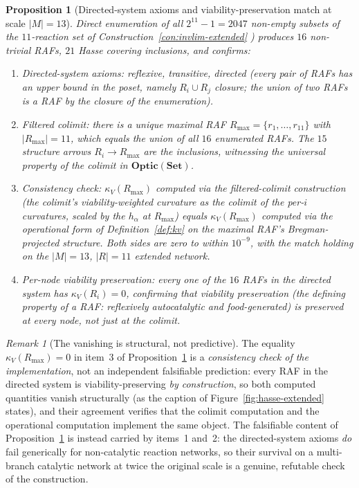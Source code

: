 \documentclass[11pt,a4paper]{article}
\theoremstyle{plain}
\newtheorem{proposition}[theorem]{Proposition}
\theoremstyle{definition}
\theoremstyle{remark}
\newtheorem{remark}[theorem]{Remark}
\newcommand{\kk}{\kappa_{\!V}}
\newcommand{\Optic}{\mathbf{Optic}}
\begin{document}
\begin{proposition}[Directed-system axioms and viability-preservation
match at scale $|M|=13$]
\label{prop:invlim-extended}
Direct enumeration of all $2^{11}-1=2047$ non-empty subsets of the
$11$-reaction set of Construction~\ref{con:invlim-extended} ) produces $16$ non-trivial
RAFs, $21$ Hasse covering inclusions, and confirms:
\begin{enumerate}[leftmargin=1.4em,itemsep=1pt]
\item \emph{Directed-system axioms}: reflexive, transitive, directed
  (every pair of RAFs has an upper bound in the poset, namely
  $R_i\cup R_j$ closure; the union of two RAFs is a RAF by the
  closure of the enumeration).
\item \emph{Filtered colimit}: there is a unique maximal RAF
  $R_{\max}=\{r_1,\ldots,r_{11}\}$ with $|R_{\max}|=11$, which
  equals the union of all $16$ enumerated RAFs. The $15$ structure
  arrows $R_i \to R_{\max}$ are the
  inclusions, witnessing the universal property of the colimit in
  $\Optic(\mathbf{Set})$.
\item \emph{Consistency check}: $\kk(R_{\max})$ computed via the
  filtered-colimit construction (the colimit's viability-weighted
  curvature as the colimit of the per-$i$ curvatures, scaled by the
  $h_\alpha$ at $R_{\max}$) equals $\kk(R_{\max})$ computed via the
  operational form of Definition~\ref{def:kv} on the
  maximal RAF's Bregman-projected structure. Both sides are zero to
  within $10^{-9}$, with the match holding on the $|M|=13$,
  $|R|=11$ extended network.
\item \emph{Per-node viability preservation}: every one of the $16$
  RAFs in the directed system has $\kk(R_i)=0$, confirming that
  viability preservation (the defining property of a RAF: reflexively
  autocatalytic and food-generated) is preserved at every node, not
  just at the colimit.
\end{enumerate}
\end{proposition}

\begin{remark}[The vanishing is structural, not predictive]
\label{rem:zero-zero}
The equality $\kk(R_{\max})=0$ in item~3 of
Proposition~\ref{prop:invlim-extended} is a \emph{consistency check
of the implementation}, not an independent falsifiable prediction:
every RAF in the directed system is viability-preserving
\emph{by construction}, so both computed quantities vanish
structurally (as the caption of Figure~\ref{fig:hasse-extended}
states), and their agreement verifies that the colimit computation
and the operational computation implement the same object. The
falsifiable content of Proposition~\ref{prop:invlim-extended} is
instead carried by items~1 and~2: the directed-system axioms
\emph{do} fail generically for non-catalytic reaction networks, so
their survival on a multi-branch catalytic network at twice the
original scale is a genuine, refutable check of the construction.
\end{remark}
\end{document}
